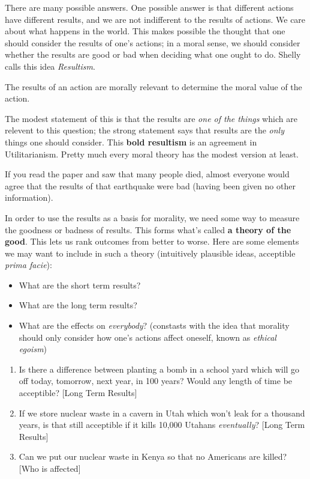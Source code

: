 There are many possible answers. One possible answer is that different actions have different results, and we are not indifferent to the results of actions. We care about what happens in the world. This makes possible the thought that one should consider the results of one's actions; in a moral sense, we should consider whether the results are good or bad when deciding what one ought to do. Shelly calls this idea \emph{Resultism}.

\begin{definition}[Resultism]
The results of an action are morally relevant to determine the moral value of the action.
\end{definition}

The modest statement of this is that the results are \emph{one of the things} which are relevent to this question; the strong statement says that results are the \emph{only} things one should consider. This \textbf{bold resultism} is an agreement in Utilitarianism. Pretty much every moral theory has the modest version at least.

\begin{example}
If you read the paper and saw that many people died, almost everyone would agree that the results of that earthquake were bad (having been given no other information).
\end{example}

In order to use the results as a basis for morality, we need some way to measure the goodness or badness of results. This forms what's called \textbf{a theory of the good}. This lets us rank outcomes from better to worse. Here are some elements we may want to include in such a theory (intuitively plausible ideas, acceptible \emph{prima facie}):
\begin{itemize}
\item What are the short term results?
\item What are the long term results?
\item What are the effects on \emph{everybody}? (constasts with the idea that morality should only consider how one's actions affect oneself, known as \emph{ethical egoism})
\end{itemize}

\begin{example}
\begin{enumerate}
\item Is there a difference between planting a bomb in a school yard which will go off today, tomorrow, next year, in 100 years? Would any length of time be acceptible? [Long Term Results]
\item If we store nuclear waste in a cavern in Utah which won't leak for a thousand years, is that still acceptible if it kills 10,000 Utahans \emph{eventually}? [Long Term Results]
\item Can we put our nuclear waste in Kenya so that no Americans are killed? [Who is affected]
\end{enumerate}
\end{example}

